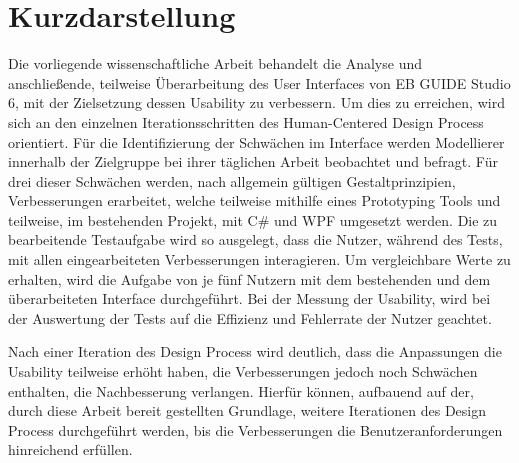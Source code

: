 \thispagestyle{empty}
\section*{Kurzdarstellung}
\label{sec:kurzdarstellung}

Die vorliegende wissenschaftliche Arbeit behandelt die Analyse und anschließende, teilweise Überarbeitung des User Interfaces von EB GUIDE Studio 6, mit der Zielsetzung dessen Usability zu verbessern.
Um dies zu erreichen, wird sich an den einzelnen Iterationsschritten des Human-Centered Design Process orientiert.
Für die Identifizierung der Schwächen im Interface werden Modellierer innerhalb der Zielgruppe bei ihrer täglichen Arbeit beobachtet und befragt.
Für drei dieser Schwächen werden, nach allgemein gültigen Gestaltprinzipien, Verbesserungen erarbeitet, welche teilweise mithilfe eines Prototyping Tools und teilweise, im bestehenden Projekt, mit C\# und WPF umgesetzt werden.
Die zu bearbeitende Testaufgabe wird so ausgelegt, dass die Nutzer, während des Tests, mit allen eingearbeiteten Verbesserungen interagieren.
Um vergleichbare Werte zu erhalten, wird die Aufgabe von je fünf Nutzern mit dem bestehenden und dem überarbeiteten Interface durchgeführt.
Bei der Messung der Usability, wird bei der Auswertung der Tests auf die Effizienz und Fehlerrate der Nutzer geachtet.

Nach einer Iteration des Design Process wird deutlich, dass die Anpassungen die Usability teilweise erhöht haben, die Verbesserungen jedoch noch Schwächen enthalten, die Nachbesserung verlangen.
Hierfür können, aufbauend auf der, durch diese Arbeit bereit gestellten Grundlage, weitere Iterationen des Design Process durchgeführt werden, bis die Verbesserungen die Benutzeranforderungen hinreichend erfüllen.


